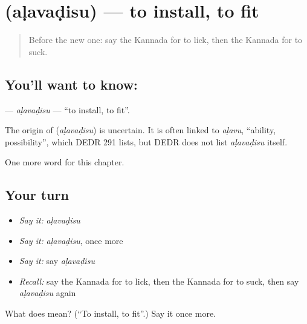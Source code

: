 \section[\texorpdfstring{\kn{ಅಳವಡಿಸು} (aḷavaḍisu)}{ಅಳವಡಿಸು (aḷavaḍisu)}]{ (aḷavaḍisu) — to install, to fit}

\label{lesson:KA-C244-alavadisu}



\begin{quote}
Before the new one: say the Kannada for to lick, then the Kannada for to suck.
\end{quote}

\subsection*{You'll want to know: }
\textbf{} — \emph{aḷavaḍisu} — \textquotedblleft{}to install, to fit\textquotedblright{}.

\begin{cousinweb}
The origin of \textbf{} (\emph{aḷavaḍisu}) is uncertain. It is often linked to \emph{aḷavu}, \textquotedblleft{}ability, possibility\textquotedblright{}, which DEDR 291 lists, but DEDR does not list \emph{aḷavaḍisu} itself.
\end{cousinweb}

\begin{grammarlens}[title={What you've built}]
One more word for this chapter.
\end{grammarlens}

\subsection*{Your turn}
\begin{itemize}
\raggedright
  \item \emph{Say it:} \emph{aḷavaḍisu}
  \item \emph{Say it:} \emph{aḷavaḍisu}, once more
  \item \emph{Say it:} say \emph{aḷavaḍisu}
  \item \emph{Recall:} say the Kannada for to lick, then the Kannada for to suck, then say \emph{aḷavaḍisu} again
\end{itemize}

\begin{tcolorbox}[breakable,colback=teal!4,colframe=teal!35!black,title={Before you move on}]
What does  mean? (\textquotedblleft{}To install, to fit\textquotedblright{}.) Say it once more.
\end{tcolorbox}
